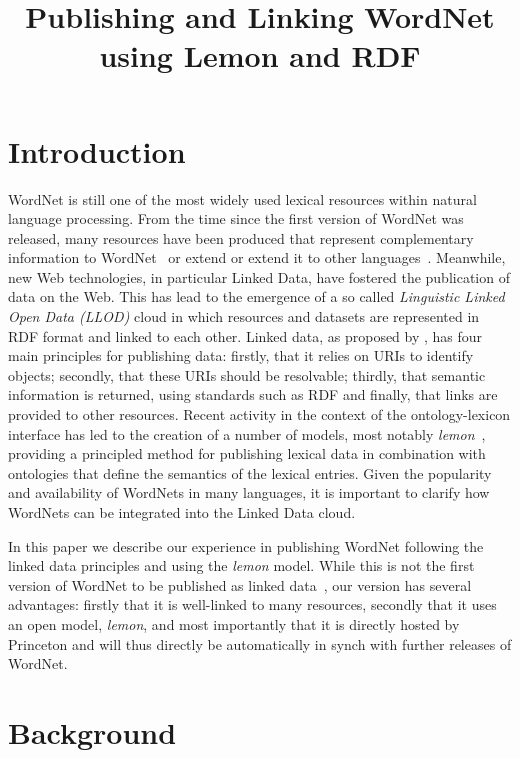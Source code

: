 \documentclass[10pt, a4paper]{article}
\title{Publishing and Linking WordNet using Lemon and RDF}
\newcommand{\lemon}[0]{\emph{lemon}}
\begin{document}
\maketitleabstract

\section{Introduction}

WordNet is still one of the most widely used lexical resources within natural 
language processing. From the time since the first version of WordNet was released, many
resources have been produced that represent complementary information to WordNet~\cite{schuler2005verbnet,baker1998berkeley} or extend
or extend it to other languages~\cite{vossen1998eurowordnet,bond2013linking}. 
Meanwhile, new Web technologies, in particular Linked Data, have fostered the publication of data on the Web.
This has lead to the emergence of a so called \emph{Linguistic Linked Open Data (LLOD)} cloud in which resources and datasets are represented in RDF format and linked to each other.
Linked data, as proposed by \cite{berners2011linked}, has four
main principles for publishing data: firstly, that it relies on URIs to identify
objects; secondly, that these URIs should be resolvable; thirdly, that semantic
information is returned, using standards such as RDF and finally, that links are
provided to other resources. 
Recent activity in the context of the ontology-lexicon interface has
led to the creation of a number of models, most notably
\lemon{}~\cite{mccrae2012interchanging}, providing a principled method for publishing lexical data in combination with ontologies that define the semantics of the lexical entries.
Given the popularity and availability of WordNets in
many languages, it is important to clarify how WordNets can be integrated into the Linked Data cloud.

In this paper we describe our experience
in publishing WordNet following the linked data principles and using the \lemon{} model. While this is not
the first version of WordNet to be published as linked data~\cite{van2006conversion,mccrae2012integrating,graves2006data}, our 
version has several advantages: firstly that it is well-linked to many
resources, secondly that it uses an open model, \emph{lemon}, and most importantly that 
it is directly hosted by Princeton and will thus directly be automatically in synch with further releases of WordNet.

\section{Background}
\end{document}

